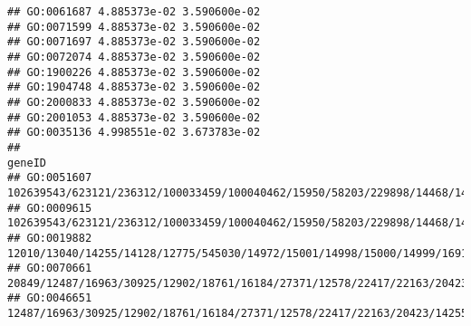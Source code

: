 \documentclass[
]{article}
\begin{document}
\begin{verbatim}
## GO:0061687 4.885373e-02 3.590600e-02
## GO:0071599 4.885373e-02 3.590600e-02
## GO:0071697 4.885373e-02 3.590600e-02
## GO:0072074 4.885373e-02 3.590600e-02
## GO:1900226 4.885373e-02 3.590600e-02
## GO:1904748 4.885373e-02 3.590600e-02
## GO:2000833 4.885373e-02 3.590600e-02
## GO:2001053 4.885373e-02 3.590600e-02
## GO:0035136 4.998551e-02 3.673783e-02
##                                                                                                                                                                                                                                                                                                                                                                                                                  geneID
## GO:0051607                                      102639543/623121/236312/100033459/100040462/15950/58203/229898/14468/14469/100038882/23962/231655/246728/246727/23961/23960/246730/12525/20928/94094/76681/434219/20128/209387/16411/12176/68713/54123/27027/234311/69550/434341/81897/16160/637515/276950/20304/80861/58185/217845/78416/67775/17858/110558/224762/224840/15958/15959/667373/667370/112419/15957/20371
## GO:0009615 102639543/623121/236312/100033459/100040462/15950/58203/229898/14468/14469/18619/100038882/23962/231655/246728/246727/23961/23960/246730/14255/12525/20928/94094/76681/434219/20128/209387/16411/12176/68713/54123/27027/234311/69550/434341/18985/81897/16160/637515/276950/20304/80861/58185/76933/217845/545030/78416/67775/17857/17858/110558/224762/224840/15958/15959/667373/667370/112419/15957/20371
## GO:0019882                                                                                                                                                                                        12010/13040/14255/14128/12775/545030/14972/15001/14998/15000/14999/16912/21354/16913/21355/15002/14961/14960/14969/381091/15006/15013/15015/110557/15018/68395/110558/15039/100529082/15024/667977/14990/224840/16149
## GO:0070661                                                                          20849/12487/16963/30925/12902/18761/16184/27371/12578/22417/22163/20423/14255/93675/12518/12483/243958/12478/27027/170786/24099/15930/76527/12501/81897/16160/57916/20556/20304/12775/20533/20666/17079/14165/21943/321019/72049/208154/320484/15000/14999/14960/547431/11629/69816/16149/14419/12511/60533/58205/20371/17986/12229
## GO:0046651                                                                                                  12487/16963/30925/12902/18761/16184/27371/12578/22417/22163/20423/14255/93675/12518/12483/243958/12478/27027/170786/24099/15930/12501/81897/16160/57916/20556/20304/12775/20533/20666/17079/14165/321019/72049/208154/320484/15000/14999/14960/547431/11629/69816/16149/14419/12511/60533/58205/20371/12229

\end{verbatim}
\end{document}
